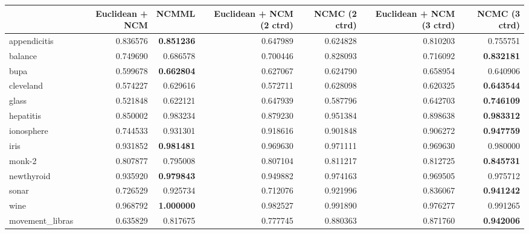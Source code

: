 \begin{tabular}{lrrrrrr}
\toprule
{} &  Euclidean + NCM &     NCMML &  Euclidean + NCM (2 ctrd) &  NCMC (2 ctrd) &  Euclidean + NCM (3 ctrd) &  NCMC (3 ctrd) \\
\midrule
appendicitis    &         0.836576 &  \textbf{0.851236} &                  0.647989 &       0.624828 &                  0.810203 &       0.755751 \\
balance         &         0.749690 &  0.686578 &                  0.700446 &       0.828093 &                  0.716092 &       \textbf{0.832181} \\
bupa            &         0.599678 &  \textbf{0.662804} &                  0.627067 &       0.624790 &                  0.658954 &       0.640906 \\
cleveland       &         0.574227 &  0.629616 &                  0.572711 &       0.628098 &                  0.620325 &       \textbf{0.643544} \\
glass           &         0.521848 &  0.622121 &                  0.647939 &       0.587796 &                  0.642703 &       \textbf{0.746109} \\
hepatitis       &         0.850002 &  0.983234 &                  0.879230 &       0.951384 &                  0.898638 &       \textbf{0.983312} \\
ionosphere      &         0.744533 &  0.931301 &                  0.918616 &       0.901848 &                  0.906272 &       \textbf{0.947759} \\
iris            &         0.931852 &  \textbf{0.981481} &                  0.969630 &       0.971111 &                  0.969630 &       0.980000 \\
monk-2          &         0.807877 &  0.795008 &                  0.807104 &       0.811217 &                  0.812725 &       \textbf{0.845731} \\
newthyroid      &         0.935920 &  \textbf{0.979843} &                  0.949882 &       0.974163 &                  0.969505 &       0.975712 \\
sonar           &         0.726529 &  0.925734 &                  0.712076 &       0.921996 &                  0.836067 &       \textbf{0.941242} \\
wine            &         0.968792 &  \textbf{1.000000} &                  0.982527 &       0.991890 &                  0.976277 &       0.991265 \\
movement\_libras &         0.635829 &  0.817675 &                  0.777745 &       0.880363 &                  0.871760 &       \textbf{0.942006} \\

\end{tabular}
